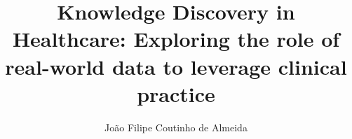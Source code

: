 \documentclass[11pt,a4paper,twoside,openright]{report}
\begin{document}
%
\onehalfspacing
\title{Knowledge Discovery in Healthcare: Exploring the role of real-world data to leverage clinical practice}

\author{João Filipe Coutinho de Almeida}








\end{document}
